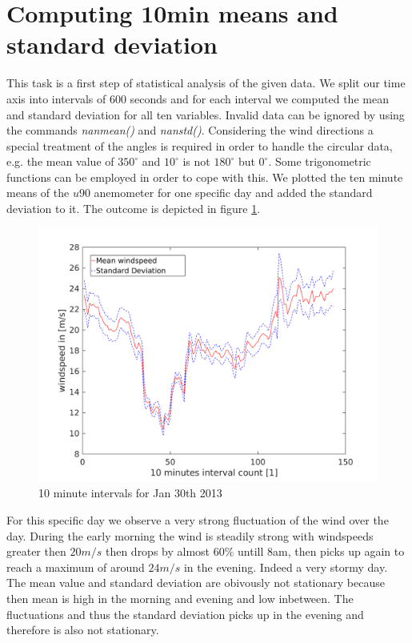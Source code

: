 \documentclass[10pt]{article}
\begin{document}
\section{Computing 10min means and standard deviation}
This task is a first step of statistical analysis of the given data. We split our time axis into intervals of 600 seconds and for each interval we computed the mean and standard deviation for all ten variables. Invalid data can be ignored by using the commands \textit{nanmean()} and \textit{nanstd()}. Considering the wind directions a special treatment of the angles is required in order to handle the circular data, e.g. the mean value of $350^{\circ}$ and $10^{\circ}$ is not $180^{\circ}$ but $0^{\circ}$. Some trigonometric functions can be employed in order to cope with this. We plotted the ten minute means of the $u90$ anemometer for one specific day and added the standard deviation to it. The outcome is depicted in figure \ref{fig:means}.\\
\begin{figure}[htb!]
  \centering
  \includegraphics[width=1\linewidth]{../Plots/mean_interval_withstd.png}
  \caption{10 minute intervals for Jan 30th 2013}
  \label{fig:means}
\end{figure}

For this specific day we observe a very strong fluctuation of the wind over the day. During the early morning the wind is steadily strong with windspeeds greater then $20 m/s$ then drops by almost $60 \%$ untill 8am, then picks up again to reach a maximum of around $24 m/s$ in the evening. Indeed a very stormy day. The mean value and standard deviation are obivously not stationary because then mean is high in the morning and evening and low inbetween. The fluctuations and thus the standard deviation picks up in the evening and therefore is also not stationary.
\end{document}
